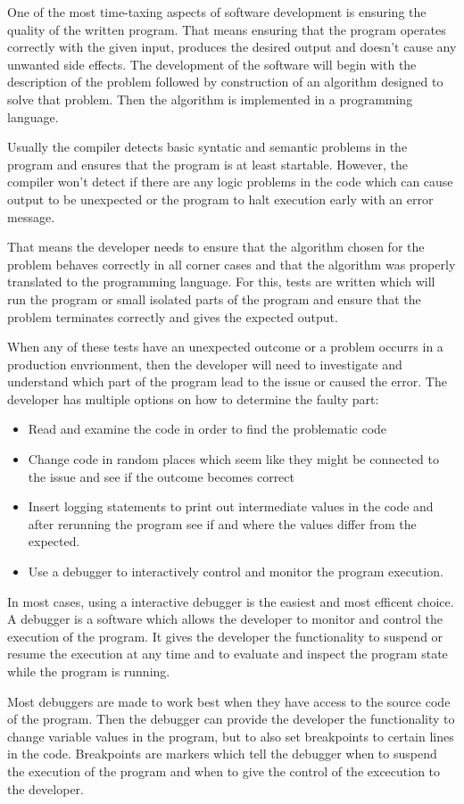 \documentclass[..thesis.tex]{subfiles}
\begin{document}
One of the most time-taxing aspects of software development is ensuring the quality of the written program. 
That means ensuring that the program operates correctly with the given input, produces the desired output and doesn't cause any unwanted side effects.
The development of the software will begin with the description of the problem followed by construction of an algorithm designed to solve that problem. 
Then the algorithm is implemented in a programming language.

Usually the compiler detects basic syntatic and semantic problems in the program and ensures that the program is at least startable. 
However, the compiler won't detect if there are any logic problems in the code which can cause output to be unexpected or the program to halt execution early with an error message.

That means the developer needs to ensure that the algorithm chosen for the problem behaves correctly in all corner cases and that the algorithm was properly translated to the programming language. 
For this, tests are written which will run the program or small isolated parts of the program and ensure that the problem terminates correctly and gives the expected output.

When any of these tests have an unexpected outcome or a problem occurrs in a production envrionment, then the developer will need to investigate and understand which part of the program lead to the issue or caused the error.
The developer has multiple options on how to determine the faulty part:
\begin{itemize}
  \item Read and examine the code in order to find the problematic code
  \item Change code in random places which seem like they might be connected to the issue and see if the outcome becomes correct
  \item Insert logging statements to print out intermediate values in the code and after rerunning the program see if and where the values differ from the expected.
  \item Use a debugger to interactively control and monitor the program execution.
\end{itemize}

In most cases, using a interactive debugger is the easiest and most efficent choice. 
A debugger is a software which allows the developer to monitor and control the execution of the program.
It gives the developer the functionality to suspend or resume the execution at any time and to evaluate and inspect the program state while the program is running. 

Most debuggers are made to work best when they have access to the source code of the program. 
Then the debugger can provide the developer the functionality to change variable values in the program, but to also set breakpoints to certain lines in the code. 
Breakpoints are markers which tell the debugger when to suspend the execution of the program and when to give the control of the excecution to the developer.
\end{document}
